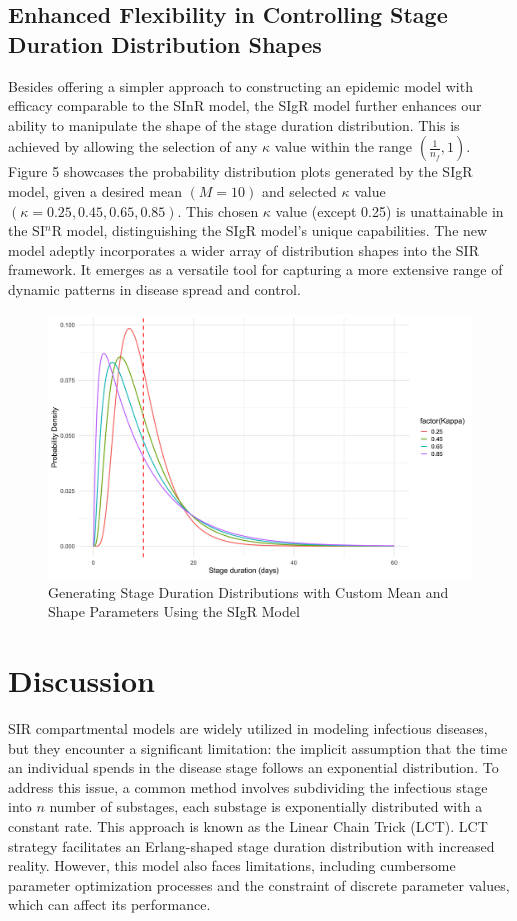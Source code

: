 \documentclass[12pt]{article}
\begin{document}
\subsection{Enhanced Flexibility in Controlling Stage Duration Distribution Shapes}
Besides offering a simpler approach to constructing an epidemic model with efficacy comparable to the SInR model, the SIgR model further enhances our ability to manipulate the shape of the stage duration distribution. This is achieved by allowing the selection of any $\kappa$ value within the range $(\frac{1}{n_f}, 1)$. Figure 5 showcases the probability distribution plots generated by the SIgR model, given a desired mean $(M=10)$ and selected $\kappa$ value $(\kappa = 0.25, 0.45, 0.65, 0.85)$. This chosen $\kappa$ value (except 0.25) is unattainable in the SI$^n$R model, distinguishing the SIgR model's unique capabilities. The new model adeptly incorporates a wider array of distribution shapes into the SIR framework. It emerges as a versatile tool for capturing a more extensive range of dynamic patterns in disease spread and control.
\begin{figure}[h]
    \centering
    \includegraphics[width= \textwidth]{4.4.2.png}
    \caption{Generating Stage Duration Distributions with Custom Mean and Shape Parameters Using the SIgR Model}
\end{figure}

    


\section{Discussion}
SIR compartmental models are widely utilized in modeling infectious diseases, but they encounter a significant limitation: the implicit assumption that the time an individual spends in the disease stage follows an exponential distribution. To address this issue, a common method involves subdividing the infectious stage into $n$ number of substages, each substage is exponentially distributed with a constant rate. This approach is known as the Linear Chain Trick (LCT). LCT strategy facilitates an Erlang-shaped stage duration distribution with increased reality. However, this model also faces limitations, including cumbersome parameter optimization processes and the constraint of discrete parameter values, which can affect its performance.
\end{document}

